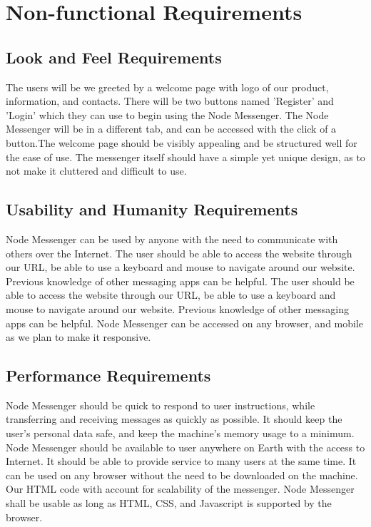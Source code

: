 \documentclass[12pt, titlepage]{article}
\begin{document}
		
	\newpage
    \section{Non-functional Requirements}

    	\subsection{Look and Feel Requirements}
    	The users will be we greeted by a welcome page with logo of our product, information, and contacts. There will be two buttons named 'Register' and 'Login' which they can use to begin using the Node Messenger. The Node Messenger will be in a different tab, and can be accessed with the click of a button.The welcome page should be visibly appealing and be structured well for the ease of use. The messenger itself should have a simple yet unique design, as to not make it cluttered and difficult to use.

    	\subsection{Usability and Humanity Requirements}
		Node Messenger can be used by anyone with the need to communicate with others over the Internet. The user should be able to access the website through our URL, be able to use a keyboard and mouse to navigate around our website. Previous knowledge of other messaging apps can be helpful. The user should be able to access the website through our URL, be able to use a keyboard and mouse to navigate around our website. Previous knowledge of other messaging apps can be helpful. Node Messenger can be accessed on any browser, and mobile as we plan to make it responsive.
    	\subsection{Performance Requirements}
		Node Messenger should be quick to respond to user instructions, while transferring and receiving messages as quickly as possible. It should keep the user's personal data safe, and keep the machine's memory usage to a minimum. Node Messenger should be available to user anywhere on Earth with the access to Internet. It should be able to provide service to many users at the same time. It can be used on any browser without the need to be downloaded on the machine. Our HTML code with account for scalability of the messenger. Node Messenger shall be usable as long as HTML, CSS, and Javascript is supported by the browser.
\end{document}
